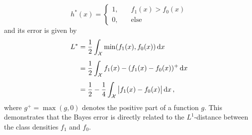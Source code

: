 \[
    h^*(x) = \begin{cases}
        1, \quad & f_1(x) > f_0(x) \\
        0, \quad &\text{else}
    \end{cases}
\]
and its error is given by
\begin{align*}
    L^* &= \frac{1}{2} \int_{\mathcal{X}} \min(f_1(x), f_0(x)) \,\mathrm{d}x \\[4pt]
        &= \frac{1}{2} \int_{\mathcal{X}} f_1(x) - (f_1(x) - f_0(x))^+ \,\mathrm{d}x \\[4pt]
        &= \frac{1}{2} - \frac{1}{4} \int_{\mathcal{X}} \big\lvert f_1(x) - f_0(x) \big\rvert \,\mathrm{d}x \, ,
\end{align*}
where $g^+ = \max(g, 0)$ denotes the positive part of a function $g$. This demonstrates that the Bayes error is directly related to the $L^1$-distance between the class densities $f_1$ and $f_0$.
